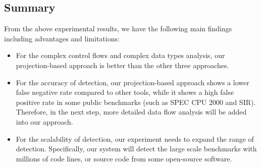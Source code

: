 \subsection{Summary}
From the above experimental results, we have the following main findings including advantages and limitations: 
\begin{itemize}
\item 
For the complex control flows and complex data types analysis, our projection-based approach is better than the other three approaches.
\item 
For the accuracy of detection, our projection-based approach shows a lower false negative rate compared to other tools, while it shows a high false positive rate in some public benchmarks (such as SPEC CPU $2000$ and SIR). Therefore, in the next step, more detailed data flow analysis will be added into our approach.
\item 
For the scalability of detection, our experiment needs to expand the range of detection. Specifically, our system will detect the large scale benchmarks with millions of code lines, or source code from some open-source software.
\end{itemize}
